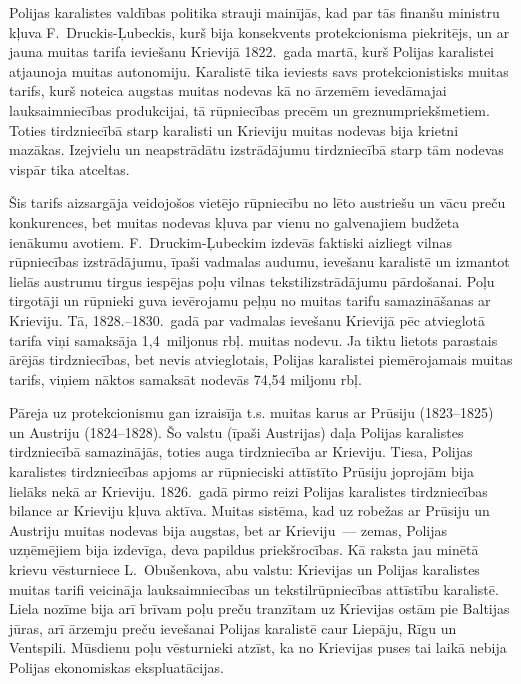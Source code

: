 \documentclass[twoside,a5paper,12pt,fleqn,openany]{extbook}
\begin{document}
Polijas karalistes valdības politika strauji mainījās, kad par tās finanšu ministru kļuva F.~Druckis-Ļubeckis, kurš bija konsekvents protekcionisma piekritējs, un ar jauna muitas tarifa ieviešanu Krievijā 1822.~gada martā, kurš Polijas karalistei atjaunoja muitas autonomiju. Karalistē tika ieviests savs protekcionistisks muitas tarifs, kurš noteica augstas muitas nodevas kā no ārzemēm ievedāmajai lauksaimniecības produkcijai, tā rūpniecības precēm un greznumpriekšmetiem. Toties tirdzniecībā starp karalisti un Krieviju muitas nodevas bija krietni mazākas. Izejvielu un neapstrādātu izstrādājumu tirdzniecībā starp tām nodevas vispār tika atceltas.

Šis tarifs aizsargāja veidojošos vietējo rūpniecību no lēto austriešu un vācu preču konkurences, bet muitas nodevas kļuva par vienu no galvenajiem budžeta ienākumu avotiem. F.~Druckim-Ļubeckim izdevās faktiski aizliegt vilnas rūpniecības izstrādājumu, īpaši vadmalas audumu, ievešanu karalistē un izmantot lielās austrumu tirgus iespējas poļu vilnas tekstilizstrādājumu pārdošanai. Poļu tirgotāji un rūpnieki guva ievērojamu peļņu no muitas tarifu samazināšanas ar Krieviju. Tā, 1828.--1830.~gadā par vadmalas ievešanu Krievijā pēc atvieglotā tarifa viņi samaksāja 1,4~miljonus rbļ. muitas nodevu. Ja tiktu lietots parastais ārējās tirdzniecības, bet nevis atvieglotais, Polijas karalistei piemērojamais muitas tarifs, viņiem nāktos samaksāt nodevās 74,54 miljonu rbļ.

Pāreja uz protekcionismu gan izraisīja t.s. muitas karus ar Prūsiju (1823--1825) un Austriju (1824--1828). Šo valstu (īpaši Austrijas) daļa Polijas karalistes tirdzniecībā samazinājās, toties auga tirdzniecība ar Krieviju. Tiesa, Polijas karalistes tirdzniecības apjoms ar rūpnieciski attīstīto Prūsiju joprojām bija lielāks nekā ar Krieviju. 1826.~gadā pirmo reizi Polijas karalistes tirdzniecības bilance ar Krieviju kļuva aktīva. Muitas sistēma, kad uz robežas ar Prūsiju un Austriju muitas nodevas bija augstas, bet ar Krieviju~--- zemas, Polijas uzņēmējiem bija izdevīga, deva papildus priekšrocības. Kā raksta jau minētā krievu vēsturniece L.~Obušenkova, abu valstu: Krievijas un Polijas karalistes muitas tarifi veicināja lauksaimniecības un tekstilrūpniecības attīstību karalistē. Liela nozīme bija arī brīvam poļu preču tranzītam uz Krievijas ostām pie Baltijas jūras, arī ārzemju preču ievešanai Polijas karalistē caur Liepāju, Rīgu un Ventspili. Mūsdienu poļu vēsturnieki atzīst, ka no Krievijas puses tai laikā nebija Polijas ekonomiskas ekspluatācijas.
\end{document}
